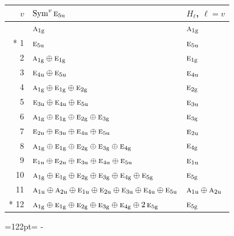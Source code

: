 \documentclass[10pt,a4paper]{article}
\newcommand{\needspace}[1]{\par\penalty-100\begingroup\dimen0=#1\relax\dimen2=\pagegoal
  \advance\dimen2-\pagetotal\ifdim\dimen0>\dimen2\relax\ifdim\dimen2>0pt\vfil\break\fi\fi
  \endgroup}
\numberwithin{equation}{section}
\newcommand{\irr}[1]{\text{\normalfont\scshape #1}}
\newcommand{\ptag}[1]{\mathrm{#1}}
\begin{document}
{\small\begin{longtable}{@{}rll@{}}\toprule
$v$ & $\operatorname{Sym}^{v}\irr{e}_{5\ptag{u}}$ & $H_\ell$, $\ell = v$\\\midrule\endhead
\bottomrule\endfoot\endlastfoot
0 & $\irr{a}_{1\ptag{g}}$ & $\irr{a}_{1\ptag{g}}$\\*
1 & $\irr{e}_{5\ptag{u}}$ & $\irr{e}_{5\ptag{u}}$\\
2 & $\irr{a}_{1\ptag{g}} \oplus \irr{e}_{1\ptag{g}}$ & $\irr{e}_{1\ptag{g}}$\\
3 & $\irr{e}_{4\ptag{u}} \oplus \irr{e}_{5\ptag{u}}$ & $\irr{e}_{4\ptag{u}}$\\
4 & $\irr{a}_{1\ptag{g}} \oplus \irr{e}_{1\ptag{g}} \oplus \irr{e}_{2\ptag{g}}$ & $\irr{e}_{2\ptag{g}}$\\
5 & $\irr{e}_{3\ptag{u}} \oplus \irr{e}_{4\ptag{u}} \oplus \irr{e}_{5\ptag{u}}$ & $\irr{e}_{3\ptag{u}}$\\
6 & $\irr{a}_{1\ptag{g}} \oplus \irr{e}_{1\ptag{g}} \oplus \irr{e}_{2\ptag{g}} \oplus \irr{e}_{3\ptag{g}}$ & $\irr{e}_{3\ptag{g}}$\\
7 & $\irr{e}_{2\ptag{u}} \oplus \irr{e}_{3\ptag{u}} \oplus \irr{e}_{4\ptag{u}} \oplus \irr{e}_{5\ptag{u}}$ & $\irr{e}_{2\ptag{u}}$\\
8 & $\irr{a}_{1\ptag{g}} \oplus \irr{e}_{1\ptag{g}} \oplus \irr{e}_{2\ptag{g}} \oplus \irr{e}_{3\ptag{g}} \oplus \irr{e}_{4\ptag{g}}$ & $\irr{e}_{4\ptag{g}}$\\
9 & $\irr{e}_{1\ptag{u}} \oplus \irr{e}_{2\ptag{u}} \oplus \irr{e}_{3\ptag{u}} \oplus \irr{e}_{4\ptag{u}} \oplus \irr{e}_{5\ptag{u}}$ & $\irr{e}_{1\ptag{u}}$\\
10 & $\irr{a}_{1\ptag{g}} \oplus \irr{e}_{1\ptag{g}} \oplus \irr{e}_{2\ptag{g}} \oplus \irr{e}_{3\ptag{g}} \oplus \irr{e}_{4\ptag{g}} \oplus \irr{e}_{5\ptag{g}}$ & $\irr{e}_{5\ptag{g}}$\\
11 & $\irr{a}_{1\ptag{u}} \oplus \irr{a}_{2\ptag{u}} \oplus \irr{e}_{1\ptag{u}} \oplus \irr{e}_{2\ptag{u}} \oplus \irr{e}_{3\ptag{u}} \oplus \irr{e}_{4\ptag{u}} \oplus \irr{e}_{5\ptag{u}}$ & $\irr{a}_{1\ptag{u}} \oplus \irr{a}_{2\ptag{u}}$\\*
12 & $\irr{a}_{1\ptag{g}} \oplus \irr{e}_{1\ptag{g}} \oplus \irr{e}_{2\ptag{g}} \oplus \irr{e}_{3\ptag{g}} \oplus \irr{e}_{4\ptag{g}} \oplus 2\,\irr{e}_{5\ptag{g}}$ & $\irr{e}_{5\ptag{g}}$\\
\bottomrule\end{longtable}}
\needspace{122pt}
\end{document}
